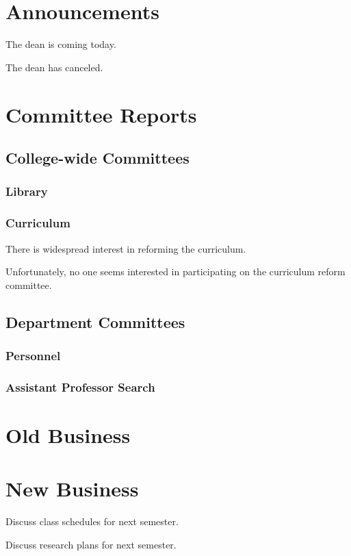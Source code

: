 \documentclass[11pt,agenda]{meetingmins}
\begin{document}
\maketitle

\section{Announcements}
\begin{hiddenitems}
\item
The dean is coming today.
\item
The dean has canceled.
\end{hiddenitems}


\section{Committee Reports}
\subsection{College-wide Committees}
\subsubsection{Library}
\subsubsection{Curriculum}

\begin{hiddensubitems}
\item
There is widespread interest in reforming
the curriculum.
\item
Unfortunately, no one seems interested
in participating on the curriculum
reform committee.

\end{hiddensubitems}
\subsection{Department Committees}
\subsubsection{Personnel}
\subsubsection{Assistant Professor Search}
\section{Old Business}
\begin{items}
\item
\priormins
\end{items}
\section{New Business}
\begin{items}
\item
Discuss class schedules for next semester.
\item
Discuss research plans for next semester.
\end{items}
\vspace{1em}

\end{document}
